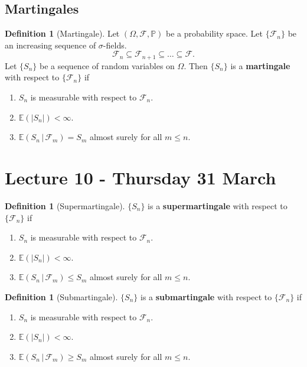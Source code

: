 \documentclass[10pt, oneside, reqno]{amsart}
\theoremstyle{plain}%
\theoremstyle{definition}
\newtheorem{defn}[thm]{Definition}
\theoremstyle{remark}
\newcommand{\sigf}{\mathcal{F}}
\newcommand{\E}{\mathbb{E}}
\renewcommand{\P}{\mathbb{P}}
\begin{document}
\subsection{Martingales} %
\label{sub:martingales}

\begin{defn}[Martingale]
	Let $(\Omega, \sigf, \P)$ be a probability space.  Let $\{ \sigf_n \}$ be an increasing sequence of $\sigma$-fields.  \[
		\sigf_n \subseteq \sigf_{n+1} \subseteq \dots \subseteq \sigf. 
	\]  Let $\{ S_n \}$ be a sequence of random variables on $\Omega$.  Then $\{ S_n \}$ is a \textbf{martingale} with respect to $\{ \sigf_n \}$ if 
	\begin{enumerate}[(1)]
		\item $S_n$ is measurable with respect to $\sigf_n$. 
		\item $\E(|S_n|) < \infty$.
		\item $\E(S_n \, | \, \sigf_m) = S_m$ almost surely for all $m \leq n$. 
	\end{enumerate}
\end{defn}


\section{Lecture 10 - Thursday 31 March} %
\label{sec:lecture_10_thursday_31_march}
\begin{defn}[Supermartingale]
$\{ S_n \}$ is a \textbf{supermartingale} with respect to $\{ \sigf_n \}$ if 
	\begin{enumerate}[(1)]
		\item $S_n$ is measurable with respect to $\sigf_n$. 
		\item $\E(|S_n|) < \infty$.
		\item $\E(S_n \, | \, \sigf_m) \leq S_m$ almost surely for all $m \leq n$. 
	\end{enumerate}
\end{defn}

\begin{defn}[Submartingale]
$\{ S_n \}$ is a \textbf{submartingale} with respect to $\{ \sigf_n \}$ if 
	\begin{enumerate}[(1)]
		\item $S_n$ is measurable with respect to $\sigf_n$. 
		\item $\E(|S_n|) < \infty$.
		\item $\E(S_n \, | \, \sigf_m) \geq S_m$ almost surely for all $m \leq n$. 
	\end{enumerate}
\end{defn}
\end{document}
